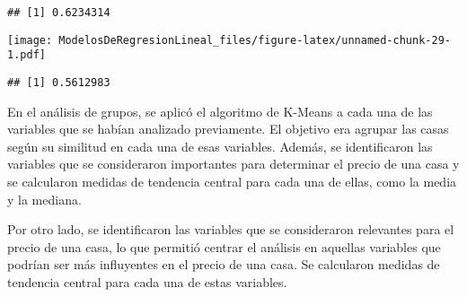 \documentclass[
]{article}
\newenvironment{Shaded}{\begin{snugshade}}{\end{snugshade}}
\newcommand{\CommentTok}[1]{\textcolor[rgb]{0.56,0.35,0.01}{\textit{#1}}}
\newcommand{\DecValTok}[1]{\textcolor[rgb]{0.00,0.00,0.81}{#1}}
\newcommand{\FunctionTok}[1]{\textcolor[rgb]{0.00,0.00,0.00}{#1}}
\newcommand{\NormalTok}[1]{#1}
\newcommand{\OtherTok}[1]{\textcolor[rgb]{0.56,0.35,0.01}{#1}}
\newcommand{\SpecialCharTok}[1]{\textcolor[rgb]{0.00,0.00,0.00}{#1}}
\begin{document}
\begin{verbatim}
## [1] 0.6234314
\end{verbatim}

\begin{Shaded}
\end{Shaded}

\texttt{[image: ModelosDeRegresionLineal\_files/figure-latex/unnamed-chunk-29-1.pdf]}

\begin{Shaded}
\end{Shaded}

\begin{verbatim}
## [1] 0.5612983
\end{verbatim}

En el análisis de grupos, se aplicó el algoritmo de K-Means a cada una
de las variables que se habían analizado previamente. El objetivo era
agrupar las casas según su similitud en cada una de esas variables.
Además, se identificaron las variables que se consideraron importantes
para determinar el precio de una casa y se calcularon medidas de
tendencia central para cada una de ellas, como la media y la mediana.

Por otro lado, se identificaron las variables que se consideraron
relevantes para el precio de una casa, lo que permitió centrar el
análisis en aquellas variables que podrían ser más influyentes en el
precio de una casa. Se calcularon medidas de tendencia central para cada
una de estas variables.
\end{document}
